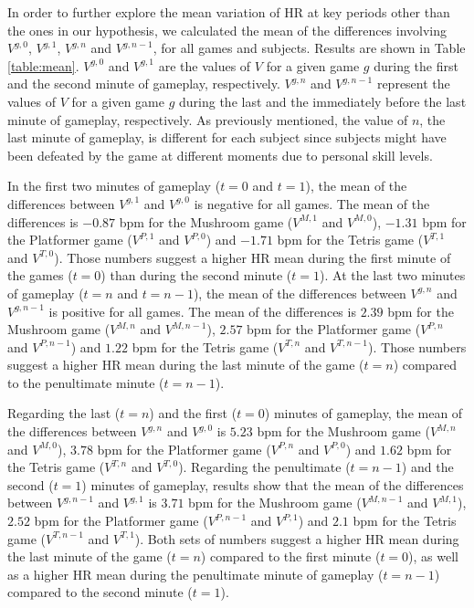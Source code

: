 In order to further explore the mean variation of HR at key periods other than the ones in our hypothesis, we calculated the mean of the differences involving $V^{g,0}$, $V^{g,1}$, $V^{g,n}$ and $V^{g,n-1}$, for all games and subjects. Results are shown in Table \ref{table:mean}. $V^{g,0}$ and $V^{g,1}$ are the values of $V$ for a given game $g$ during the first and the second minute of gameplay, respectively. $V^{g,n}$ and $V^{g,n-1}$ represent the values of $V$ for a given game $g$ during the last and the immediately before the last minute of gameplay, respectively. As previously mentioned, the value of $n$, the last minute of gameplay, is different for each subject since subjects might have been defeated by the game at different moments due to personal skill levels.

In the first two minutes of gameplay ($t=0$ and $t=1$), the mean of the differences between $V^{g,1}$ and $V^{g,0}$ is negative for all games. The mean of the differences is $-0.87$ bpm for the Mushroom game ($V^{M,1}$ and $V^{M,0}$), $-1.31$ bpm for the Platformer game ($V^{P,1}$ and $V^{P,0}$) and $-1.71$ bpm for the Tetris game ($V^{T,1}$ and $V^{T,0}$). Those numbers suggest a higher HR mean during the first minute of the games ($t=0$) than during the second minute ($t=1$). At the last two minutes of gameplay ($t=n$ and $t=n-1$), the mean of the differences between $V^{g,n}$ and $V^{g,n-1}$ is positive for all games. The mean of the differences is $2.39$ bpm for the Mushroom game ($V^{M,n}$ and $V^{M,n-1}$), $2.57$ bpm for the Platformer game ($V^{P,n}$ and $V^{P,n-1}$) and $1.22$ bpm for the Tetris game ($V^{T,n}$ and $V^{T,n-1}$). Those numbers suggest a higher HR mean during the last minute of the game ($t=n$) compared to the penultimate minute ($t=n-1$).

Regarding the last ($t=n$) and the first ($t=0$) minutes of gameplay, the mean of the differences between $V^{g,n}$ and $V^{g,0}$ is $5.23$ bpm for the Mushroom game ($V^{M,n}$ and $V^{M,0}$), $3.78$ bpm for the Platformer game ($V^{P,n}$ and $V^{P,0}$) and $1.62$ bpm for the Tetris game ($V^{T,n}$ and $V^{T,0}$). Regarding the penultimate ($t=n-1$) and the second ($t=1$) minutes of gameplay, results show that the mean of the differences between $V^{g,n-1}$ and $V^{g,1}$ is $3.71$ bpm for the Mushroom game ($V^{M,n-1}$ and $V^{M,1}$), $2.52$ bpm for the Platformer game ($V^{P,n-1}$ and $V^{P,1}$) and $2.1$ bpm for the Tetris game ($V^{T,n-1}$ and $V^{T,1}$). Both sets of numbers suggest a higher HR mean during the last minute of the game ($t=n$) compared to the first minute ($t=0$), as well as a higher HR mean during the penultimate minute of gameplay ($t=n-1$) compared to the second minute ($t=1$).

